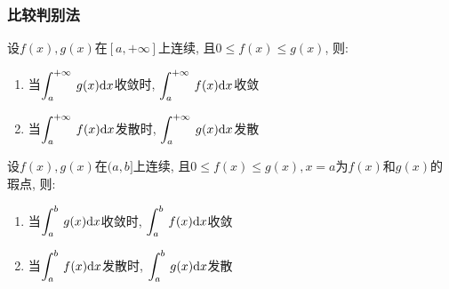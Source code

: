                 \subsubsection{比较判别法}
                \par \vspace{.5em}
                设$ f(x), g(x) $在$ [a,+\infty] $上连续, 且$ 0\le f(x)\le g(x) $, 则:
                \begin{enumerate}
                    \item 当$ \displaystyle\int_{a}^{+\infty}\hspace{.2em}g(x)\mathrm{d}x $收敛时, $ \displaystyle\int_{a}^{+\infty}\hspace{.2em}f(x)\mathrm{d}x $收敛
                    \item 当$ \displaystyle\int_{a}^{+\infty}\hspace{.2em}f(x)\mathrm{d}x $发散时, $ \displaystyle\int_{a}^{+\infty}\hspace{.2em}g(x)\mathrm{d}x $发散
                \end{enumerate}
                \par \vspace{.5em}
                设$ f(x), g(x) $在$ (a,b] $上连续, 且$ 0\le f(x)\le g(x), x=a $为$ f(x) $和$ g(x) $的瑕点, 则:
\begin{enumerate}
    \item 当$ \displaystyle\int_{a}^{b}\hspace{.2em}g(x)\mathrm{d}x $收敛时, $ \displaystyle\int_{a}^{b}\hspace{.2em}f(x)\mathrm{d}x $收敛
    \item 当$ \displaystyle\int_{a}^{b}\hspace{.2em}f(x)\mathrm{d}x $发散时, $ \displaystyle\int_{a}^{b}\hspace{.2em}g(x)\mathrm{d}x $发散
\end{enumerate}
